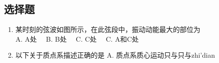 
\subsection{选择题}
\begin{enumerate}
\item 某时刻的弦波如图所示，在此弦段中，振动动能最大的部位为\\
A. A处$\quad$
B. B处$\quad$
C. C处$\quad$
C. A和C处$\quad$

\item 以下关于质点系描述正确的是
A. 质点系质心运动只与只与zhi'dian
\end{enumerate}